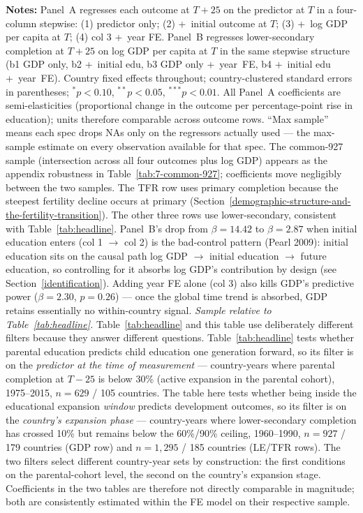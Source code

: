 \documentclass[12pt,letterpaper]{article}
\begin{document}
\begin{minipage}{\dimexpr\textwidth-2em}
\scriptsize
\textbf{Notes:} Panel~A regresses each outcome at $T{+}25$ on
the predictor at $T$ in a four-column stepwise: (1) predictor only;
(2) +~initial outcome at $T$; (3) +~log GDP per capita at $T$;
(4) col 3 +~year FE. Panel~B regresses lower-secondary completion
at $T{+}25$ on log GDP per capita at $T$ in the same stepwise
structure (b1 GDP only, b2 +~initial edu, b3 GDP only +~year~FE,
b4 +~initial edu +~year~FE). Country fixed effects throughout;
country-clustered standard errors in parentheses; $^{*}p<0.10$,
$^{**}p<0.05$, $^{***}p<0.01$. All Panel~A coefficients are
semi-elasticities (proportional change in the outcome per
percentage-point rise in education); units therefore comparable
across outcome rows. ``Max sample'' means each spec drops NAs only
on the regressors actually used --- the max-sample estimate on every
observation available for that spec. The common-927 sample
(intersection across all four outcomes plus log GDP) appears as the
appendix robustness in Table~\ref{tab:7-common-927};
coefficients move negligibly between the two samples.
The TFR row uses primary completion because the steepest fertility
decline occurs at primary
(Section~\ref{demographic-structure-and-the-fertility-transition}).
The other three rows use lower-secondary, consistent with
Table~\ref{tab:headline}. Panel~B's drop from $\beta=14.42$ to
$\beta=2.87$ when initial education enters (col 1 $\to$ col 2) is
the bad-control pattern (Pearl 2009): initial education sits on the
causal path log GDP $\to$ initial education $\to$ future education,
so controlling for it absorbs log GDP's contribution by design (see
Section~\ref{identification}).
Adding year FE alone (col 3) also kills GDP's predictive power
($\beta=2.30$, $p=0.26$) --- once the global time trend is absorbed,
GDP retains essentially no within-country signal.
\emph{Sample relative to Table~\ref{tab:headline}.} Table~\ref{tab:headline} and
this table use deliberately different filters because they answer
different questions. Table~\ref{tab:headline} tests whether parental
education predicts child education one generation forward, so its
filter is on the \emph{predictor at the time of measurement} ---
country-years where parental completion at $T{-}25$ is below 30\%
(active expansion in the parental cohort), 1975--2015, $n=629$ /
105 countries. The table here tests whether being inside the
educational expansion \emph{window} predicts development outcomes,
so its filter is on the \emph{country's expansion phase} ---
country-years where lower-secondary completion has crossed 10\% but
remains below the 60\%/90\% ceiling, 1960--1990, $n=927$ / 179
countries (GDP row) and $n=1{,}295$ / 185 countries (LE/TFR rows).
The two filters select different country-year sets by construction:
the first conditions on the parental-cohort level, the second on
the country's expansion stage. Coefficients in the two tables are
therefore not directly comparable in magnitude; both are
consistently estimated within the FE model on their respective
sample.
\end{minipage}
\end{document}

